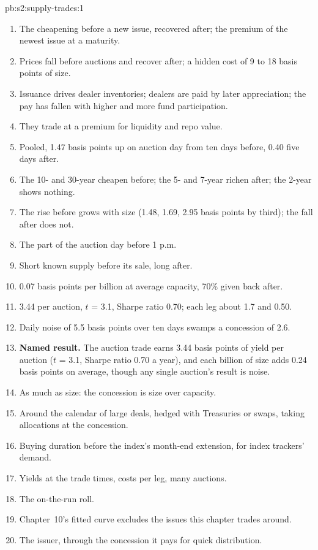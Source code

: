 \begin{solution}{pb:s2:supply-trades:1}
\begin{enumerate}
\item The cheapening before a new issue, recovered after; the premium of the newest issue at a maturity.
\item Prices fall before auctions and recover after; a hidden cost of 9 to 18 basis points of size.
\item Issuance drives dealer inventories; dealers are paid by later appreciation; the pay has fallen with higher  and more fund
participation.
\item They trade at a premium for liquidity and repo value.
\item Pooled, 1.47 basis points up on auction day from ten days before, 0.40 five days after.
\item The 10- and 30-year cheapen before; the 5- and 7-year richen after; the 2-year shows nothing.
\item The rise before grows with size (1.48, 1.69, 2.95 basis points by third); the fall after does not.
\item The part of the auction day before 1 p.m.
\item Short known supply before its sale, long after.
\item 0.07 basis points per billion at average capacity, 70\% given back after.
\item 3.44 per auction, $t$ = 3.1, Sharpe ratio 0.70; each leg about 1.7 and 0.50.
\item Daily noise of 5.5 basis points over ten days swamps a concession of 2.6.
\item \textbf{Named result.} The auction trade earns 3.44 basis points of yield per auction ($t$ = 3.1, Sharpe ratio 0.70 a year), and each billion of
size adds 0.24 basis points on average, though any single auction's result is noise.
\item As much as size: the concession is size over capacity.
\item Around the calendar of large deals, hedged with Treasuries or swaps, taking allocations at the concession.
\item Buying duration before the index's month-end extension, for index trackers' demand.
\item Yields at the trade times, costs per leg, many auctions.
\item The on-the-run roll.
\item Chapter~10's fitted curve excludes the issues this chapter trades around.
\item The issuer, through the concession it pays for quick distribution.
\end{enumerate}
\end{solution}

